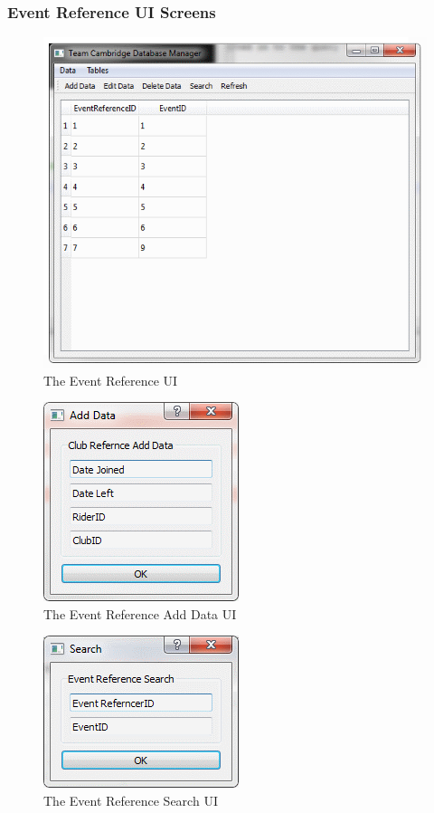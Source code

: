\subsubsection{Event Reference UI Screens}

\begin{figure}[H]
\includegraphics{./Maintenance/UI/EventRef.png}
\caption{The Event Reference UI} \label{fig:EventRef_UI}
\end{figure}

\begin{figure}[H]
\includegraphics{./Maintenance/UI/EventRefAD.png}
\caption{The Event Reference Add Data UI} \label{fig:EventRefAD_UI}
\end{figure}

\begin{figure}[H]
\includegraphics{./Maintenance/UI/EventRefSearch.png}
\caption{The Event Reference Search UI} \label{fig:EventRefSearch_UI}
\end{figure}

